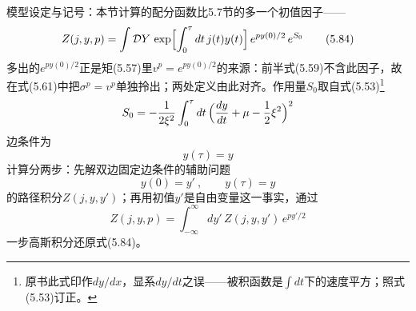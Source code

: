 模型设定与记号：本节计算的配分函数比5.7节的多一个初值因子——
\begin{equation*}
Z(j,y,p)=\int\mathcal{D}Y\,\exp\Bigl[\int_{0}^{\tau}dt\,j(t)y(t)\Bigr]\,
e^{py(0)/2}\,e^{S_{0}}
\tag{5.84}
\end{equation*}
多出的$e^{py(0)/2}$正是矩(5.57)里$v^p=e^{py(0)/2}$的来源：前半式(5.59)不含此因子，故在式(5.61)中把$\sigma^p=v^p$单独拎出；两处定义由此对齐。作用量$S_0$取自式(5.53)\footnote{原书此式印作$dy/dx$，显系$dy/dt$之误——被积函数是$\int dt$下的速度平方；照式(5.53)订正。}
\begin{equation*}
S_{0}=-\frac{1}{2\xi^{2}}\int_{0}^{\tau}dt\,
\Bigl(\frac{dy}{dt}+\mu-\frac{1}{2}\xi^{2}\Bigr)^{2}
\end{equation*}边条件为
\begin{equation*}
y(\tau)=y
\tag{5.85}
\end{equation*}
计算分两步：先解双边固定边条件的辅助问题
\begin{equation*}
y(0)=y'\ ,\qquad y(\tau)=y
\tag{5.86}
\end{equation*}
的路径积分$Z(j,y,y')$；再用初值$y'$是自由变量这一事实，通过
\begin{equation*}
Z(j,y,p)=\int_{-\infty}^{\infty}dy'\,Z(j,y,y')\,e^{py'/2}
\tag{5.87}
\end{equation*}
一步高斯积分还原式(5.84)。

